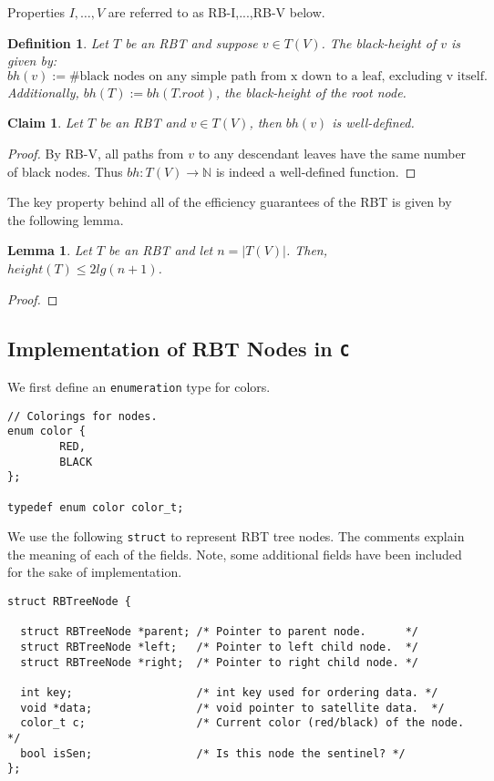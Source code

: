 \documentclass[10pt]{article}
\newtheorem{lemma}{Lemma}[section]
\newtheorem{definition}{Definition}[section]
\newtheorem{claim}{Claim}[section]
\begin{document}
Properties $I,\ldots, V$ are referred to as RB-I,...,RB-V below.

\begin{definition}
  Let $T$ be an RBT and suppose $v \in T(V)$. The \emph{black-height} of
  $v$ is given by:
    \[ bh(v) := \#\text{black nodes on any simple path from x down to a leaf,
      excluding v itself.} \]
  Additionally, $bh(T) := bh(T.root)$, the black-height of the root node.
\end{definition}

\begin{claim}
  Let $T$ be an RBT and $v \in T(V)$, then $bh(v)$ is \emph{well-defined}.
\end{claim}

\begin{proof}
  By RB-V, all paths from $v$ to any descendant leaves
  have the same number of black nodes.
  Thus $bh : T(V) \rightarrow \mathbb{N}$ is indeed a well-defined function.
\end{proof}

The key property behind all of the efficiency guarantees of the RBT is
given by the following lemma.

\begin{lemma}
  \label{rbt-height}
  Let $T$ be an RBT and let $n = |T(V)|$. Then, $height(T) \leq 2lg(n + 1)$.
\end{lemma}

\begin{proof}

\end{proof}

\subsection{Implementation of RBT Nodes in \texttt{C}}
We first define an \texttt{enumeration} type for colors.

\begin{lstlisting}
// Colorings for nodes.
enum color {
  	    RED,
  	    BLACK
};

typedef enum color color_t;
\end{lstlisting}

We use the following \texttt{struct} to represent RBT tree nodes.
The comments explain the meaning of each of the fields. Note, some additional
fields have been included for the sake of implementation.

\begin{lstlisting}
struct RBTreeNode {

  struct RBTreeNode *parent; /* Pointer to parent node.      */
  struct RBTreeNode *left;   /* Pointer to left child node.  */
  struct RBTreeNode *right;  /* Pointer to right child node. */

  int key;                   /* int key used for ordering data. */
  void *data;                /* void pointer to satellite data.  */
  color_t c;                 /* Current color (red/black) of the node. */
  bool isSen;                /* Is this node the sentinel? */
};
\end{lstlisting}
\end{document}
